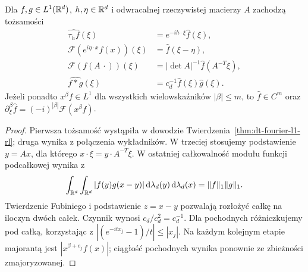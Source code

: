 \begin{stwierdzenie}
\label{prop:dt-fourier-l1-rules}
Dla $f,g\in L^1(\mathbb R^d)$, $h,\eta\in\mathbb R^d$ i odwracalnej
rzeczywistej macierzy $A$ zachodzą tożsamości
\[
\begin{aligned}
 \widehat{\tau_h f}(\xi)&=e^{-ih\cdot\xi}\widehat f(\xi),\\
 \mathcal F(e^{i\eta\cdot x}f(x))(\xi)&=\widehat f(\xi-\eta),\\
 \mathcal F(f(A\,\cdot))(\xi)&=
 |\det A|^{-1}\widehat f(A^{-T}\xi),\\
 \widehat{f*g}(\xi)&=c_d^{-1}\widehat f(\xi)\widehat g(\xi).
\end{aligned}
\]
Jeżeli ponadto $x^\beta f\in L^1$ dla wszystkich
wielowskaźników $|\beta|\le m$, to $\widehat f\in C^m$
oraz $\partial_\xi^\beta\widehat f=(-i)^{|\beta|}
\mathcal F(x^\beta f)$.
\end{stwierdzenie}
\begin{proof}
Pierwsza tożsamość wystąpiła w dowodzie
Twierdzenia~\ref{thm:dt-fourier-l1-rl}; druga wynika z
połączenia wykładników. W trzeciej stosujemy podstawienie
$y=Ax$, dla którego $x\cdot\xi=y\cdot A^{-T}\xi$.
W ostatniej całkowalność modułu funkcji podcałkowej
wynika z
\[
 \int_{\mathbb R^d}\int_{\mathbb R^d}|f(y)g(x-y)|
 \,\mathrm d\lambda_d(y)\,\mathrm d\lambda_d(x)
 =\|f\|_1\|g\|_1.
\]
Twierdzenie Fubiniego i podstawienie $z=x-y$ pozwalają
rozłożyć całkę na iloczyn dwóch całek. Czynnik wynosi
$c_d/c_d^2=c_d^{-1}$.
Dla pochodnych różniczkujemy pod całką, korzystając z
$|(e^{-itx_j}-1)/t|\le |x_j|$. Na każdym kolejnym etapie
majorantą jest $|x^{\beta+e_j}f(x)|$; ciągłość
pochodnych wynika ponownie ze zbieżności zmajoryzowanej.
\end{proof}

